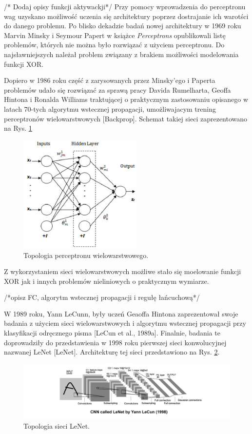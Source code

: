 /* Dodaj opisy funkcji aktywackji*/
Przy pomocy wprowadzenia do perceptronu wag uzyskano możliwość uczenia się architektury poprzez dostrajanie ich warotści do danego problemu. Po blisko dekadzie badań nowej architektury w 1969 roku Marvin Minsky i Seymour Papert w książce \textit{Perceptrons} opublikowali listę problemów, których nie można było rozwiązać z użyciem perceptronu. Do najsławniejszych należał problem związany z brakiem możliwości modelowania funkcji XOR.

Dopiero w 1986 roku część z zarysowanych przez Minsky'ego i Paperta problemów udało się rozwiązać za sprawą pracy Davida Rumelharta, Geoffa Hintona i Ronalda Williams traktującej o praktycznym zastosowaniu opisanego w latach 70-tych algorytmu wstecznej propagacji, umożliwajacym trening perceptronów wielowarstwowych [Backprop]. Schemat takiej sieci zaprezentowano na Rys. \ref{MLperceptron}
\begin{figure}[h!]
	\centering
	\includegraphics[width=0.55\textwidth]{figures/MLperceptron.png}
	\caption{Topologia perceptronu wielowarstwowego.}
	\label{MLperceptron}
\end{figure}

Z wykorzystaniem sieci wielowarstwowych możliwe stało się moelowanie funkcji XOR jak i innych problemów nieliniowych o praktycznym wymiarze. 

/*opisz FC, algorytm wstecznej propagacji i regułę łańcuchową*/

W 1989 roku, Yann LeCunn, były uczeń Geaoffa Hintona zaprezentował swoje badania z użyciem sieci wielowarstwowych i algorytmu wstecznej propagacji przy klasyfikacji odręcznego pisma [LeCun et al., 1989a]. Finalnie, badania te doprowadziły do przedstawienia w 1998 roku pierwszej sieci konwolucyjnej nazwanej LeNet [LeNet]. Architekturę tej sieci przedstawiono na Rys. \ref{LeNet}.
\begin{figure}[h!]
	\centering
	\includegraphics[width=1\textwidth]{figures/lenet.png}
	\caption{Topologia sieci LeNet.}
	\label{LeNet}
\end{figure}

